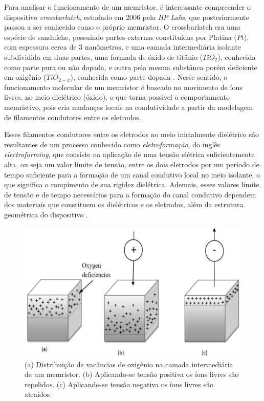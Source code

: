 \documentclass{ceel}
\begin{document}
\begin{multicols}{2}
Para analisar o funcionamento de um memristor, é interessante compreender o dispositivo \emph{crossbarlatch}, estudado em 2006 pela
\emph{HP Labs}, que posteriormente passou a ser conhecido como o próprio memristor. O crossbarlatch era uma espécie de sanduíche, possuindo partes externas constituídas por Platina ($Pt$), com espessura cerca de 3 nanômetros, e uma camada intermediária isolante subdividida em duas partes, uma formada de óxido de titânio ($TiO_2$), conhecida como parte pura ou não dopada, e outra pela mesma substânca porém deficiente em oxigênio ($TiO_{2-x}$), conhecida como parte dopada \cite{construcao}.  Nesse sentido, o funcionamento molecular de um memristor é baseado no movimento de íons livres, no meio dielétrico (óxido), o que torna possível o comportamento memristivo, pois cria mudanças locais na condutividade a partir da modelagem de filamentos condutores entre os eletrodos.

Esses filamentos condutores entre os eletrodos no meio inicialmente dielétrico são resultantes de um processo conhecido como \emph{eletroformação}, do inglês \emph{electroforming}, que consiste na aplicação de uma tensão elétrica suficientemente alta, ou seja um valor limite de tensão, entre os dois eletrodos por um período de tempo suficiente para a formação de um canal condutivo local no meio isolante, o que significa o rompimento de sua rigidez dielétrica.
Ademais, esses valores limite de tensão e de tempo necessários para a formação do canal condutivo dependem dos materiais que constituem os dielétricos e os eletrodos, além da estrutura geométrica do dispositivo \cite{us}. 

\vspace{-0.26cm}
\begin{figure}[H]
\centering
\includegraphics[width=\columnwidth]{oxygen-vacancies}
\caption{(a) Distribuição de vacâncias de oxigênio na camada intermediária de um memristor. (b) Aplicando-se tensão positiva os íons livres são repelidos. (c) Aplicando-se tensão negativa os íons livres são atraídos.}\label{estrutura}
\end{figure}


\end{multicols}
\end{document}
